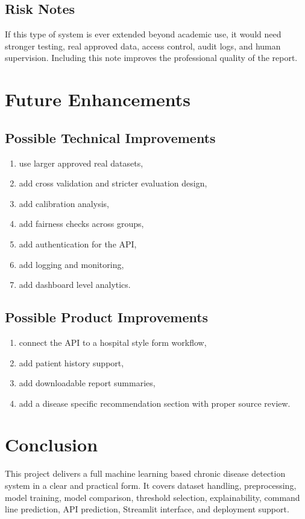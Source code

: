 \documentclass[12pt,a4paper,openany]{report}
\begin{document}
    \section{Risk Notes}
    If this type of system is ever extended beyond academic use, it would need stronger testing, real approved data, access control, audit logs, and human supervision. Including this note improves the professional quality of the report.

    \chapter{Future Enhancements}
    \section{Possible Technical Improvements}
    \begin{enumerate}[leftmargin=1.4cm]
    \item use larger approved real datasets,
    \item add cross validation and stricter evaluation design,
    \item add calibration analysis,
    \item add fairness checks across groups,
    \item add authentication for the API,
    \item add logging and monitoring,
    \item add dashboard level analytics.
    \end{enumerate}

    \section{Possible Product Improvements}
    \begin{enumerate}[leftmargin=1.4cm]
    \item connect the API to a hospital style form workflow,
    \item add patient history support,
    \item add downloadable report summaries,
    \item add a disease specific recommendation section with proper source review.
    \end{enumerate}

    \chapter{Conclusion}
    This project delivers a full machine learning based chronic disease detection system in a clear and practical form. It covers dataset handling, preprocessing, model training, model comparison, threshold selection, explainability, command line prediction, API prediction, Streamlit interface, and deployment support.
\end{document}
